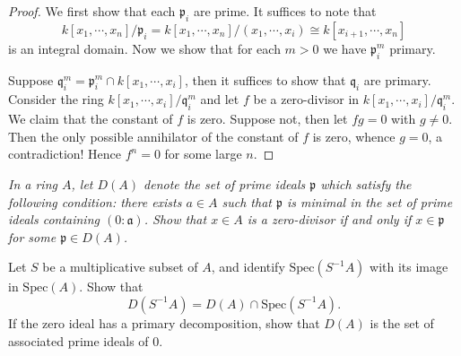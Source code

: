 \begin{proof}
We first show that each $\mathfrak{p}_i$ are prime. It suffices to note that 
$$
k\left[ x_1,\cdots ,x_n \right] /\mathfrak{p} _i=k\left[ x_1,\cdots ,x_n \right] /\left( x_1,\cdots ,x_i \right) \cong k\left[ x_{i+1},\cdots ,x_n \right] 
$$
is an integral domain. Now we show that for each $m>0$ we have $\mathfrak{p}_i^m$ primary.\par
Suppose $\mathfrak{q}_i^m=\mathfrak{p}_i^m\cap k[x_1,\cdots,x_i]$, then it suffices to show that $\mathfrak{q}_i$ are primary. Consider the ring $k[x_1,\cdots,x_i]/\mathfrak{q}_i^m$ and let $f$ be a zero-divisor in $k[x_1,\cdots,x_i]/\mathfrak{q}_i^m$. We claim that the constant of $f$ is zero. Suppose not, then let $fg=0$ with $g\ne 0$. Then the only possible annihilator of the constant of $f$ is zero, whence $g=0$, a contradiction! Hence $f^n=0$ for some large $n$.
\end{proof}
\begin{problem}\em
In a ring $A$, let $D(A)$ denote the set of prime ideals $\mathfrak{p}$ which satisfy the following condition: there exists $a\in A$ such that $\mathfrak{p}$ is minimal in the set of prime ideals containing $(0:\mathfrak{a})$. Show that $x\in A$ is a zero-divisor if and only if $x\in\mathfrak{p}$ for some $\mathfrak{p}\in D(A)$.\par
Let $S$ be a multiplicative subset of $A$, and identify $\mathrm{Spec}(S^{-1}A)$ with its image in $\mathrm{Spec}(A)$. Show that 
$$
D\left( S^{-1}A \right) =D\left( A \right) \cap \mathrm{Spec}\left( S^{-1}A \right) .
$$
If the zero ideal has a primary decomposition, show that $D(A)$ is the set of associated prime ideals of $0$.
\end{problem}
